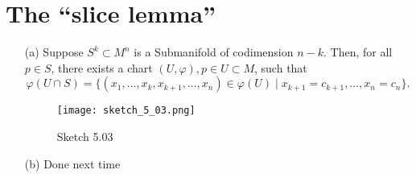 \section{The ``slice lemma''}

\begin{theorem}\label{thm:5.3}
    \begin{enumerate}
        \item[(a)] Suppose \(S^k\subset M^n\) is a Submanifold of codimension \(n-k\).
                   Then, for all \(p\in S\), there exists a chart \((U,\varphi),p\in U\subset M\), such that \[\varphi(U\cap S)=\{(x_1,\dots,x_k,x_{k+1},\dots,x_n)\in \varphi(U)\mid x_{k+1}=c_{k+1},\dots,x_{n}=c_n\}.\]  
        \begin{figure}[H]
            \centering
            \texttt{[image: sketch\_5\_03.png]}
            \caption{Sketch 5.03} 
        \end{figure}
        \item[(b)] Done next time
    \end{enumerate}
\end{theorem}